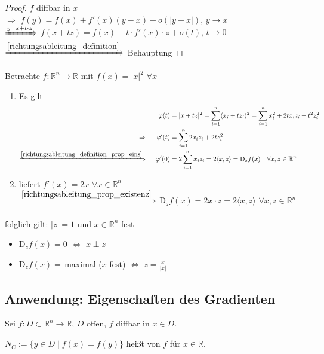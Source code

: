 \begin{proof}
	$f$ \gls{diffbar} in $x$ \\
	$\Rightarrow$ $f(y) = f(x) + f'(x) (y - x) + o(\vert y - x\vert)$, $y\to x$ \\
	$\xRightarrow{y=x+t\cdot z}$ $f(x + tz) = f(x) + t\cdot f'(x)\cdot z + o(t)$, $t\to 0$ \\
	$\xRightarrow{\eqref{richtungsableitung_definition}}$ Behauptung
\end{proof}

\begin{example}
	Betrachte $f:\mathbb{R}^n\to \mathbb{R}$ mit $f(x) = \vert x \vert ^2$ $\forall x$
	\begin{enumerate}[label={\alph*)}]
		\item Es gilt \zeroAmsmathAlignVSpaces \begin{alignat*}{2}
		 && \phi(t) &= \vert x + tz\vert ^2 = \sum_{i=1}^{n} (x_i + t z_i)^2 = \sum_{i=1}^n x_i^2 + 2t x_i z_i + t^2 z_i^2 \\
		 \Rightarrow && \phi'(t) &= \sum_{i=1}^n 2x_i z_i + 2t z_i^2 \\
		\xRightarrow{\eqref{richtungsableitung_definition_prop_eins}} &\;\;& \phi'(0) &= 2\sum_{i=1}^n x_i z_i = 2 \langle x,z\rangle = \mathrm{D}_z f(x)\quad\forall x, z\in\mathbb{R}^n
		\end{alignat*}
		\item {} liefert $f'(x) = 2x$ $\forall x\in\mathbb{R}^n$ \\
		$\xRightarrow{\eqref{richtungsableitung_prop_existenz}} $ $\mathrm{D}_z f(x) = 2x\cdot z = 2 \langle x,z\rangle$ $\forall x,z\in\mathbb{R}^n$
	\end{enumerate}
	folglich gilt: $\vert z \vert = 1$ und $x\in\mathbb{R}^n$ fest \begin{itemize}
		\item $\mathrm{D}_z f(x) = 0$ $\Leftrightarrow$ $x\perp z$
		\item $\mathrm{D}_z f(x) = \,$maximal ($x$ fest) $\Leftrightarrow$ $z = \frac{x}{\vert x \vert}$
	\end{itemize}
\end{example}

\subsection*{Anwendung: Eigenschaften des Gradienten}
\begin{*definition}
	Sei $f:D\subset\mathbb{R}^n\to \mathbb{R}$, $D$ offen, $f$ \gls{diffbar} in $x\in D$.
	
	$N_C:= \{ y\in D \mid f(x) = f(y) \}$ heißt  von $f$ für $x\in \mathbb{R}$.

\end{*definition}	

